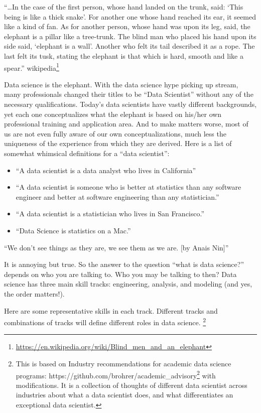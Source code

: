 \documentclass[12pt,]{krantz}
\providecommand{\tightlist}{%
  \setlength{\itemsep}{0pt}\setlength{\parskip}{0pt}}
\renewenvironment{quote}{\begin{VF}}{\end{VF}}
\renewcommand{\href}[2]{#2\footnote{\url{#1}}}
\theoremstyle{definition}
\theoremstyle{definition}
\theoremstyle{definition}
\theoremstyle{remark}
\begin{document}
\begin{quote}
``\ldots{}In the case of the first person, whose hand landed on the
trunk, said: `This being is like a thick snake'. For another one whose
hand reached its ear, it seemed like a kind of fan. As for another
person, whose hand was upon its leg, said, the elephant is a pillar like
a tree-trunk. The blind man who placed his hand upon its side said,
`elephant is a wall'. Another who felt its tail described it as a rope.
The last felt its tusk, stating the elephant is that which is hard,
smooth and like a spear.''
\href{https://en.wikipedia.org/wiki/Blind_men_and_an_elephant}{wikipedia}
\end{quote}

Data science is the elephant. With the data science hype picking up
stream, many professionals changed their titles to be ``Data Scientist''
without any of the necessary qualifications. Today's data scientists
have vastly different backgrounds, yet each one conceptualizes what the
elephant is based on his/her own professional training and application
area. And to make matters worse, most of us are not even fully aware of
our own conceptualizations, much less the uniqueness of the experience
from which they are derived. Here is a list of somewhat whimsical
definitions for a ``data scientist'':

\begin{itemize}
\tightlist
\item
  ``A data scientist is a data analyst who lives in California''
\item
  ``A data scientist is someone who is better at statistics than any
  software engineer and better at software engineering than any
  statistician.''
\item
  ``A data scientist is a statistician who lives in San Francisco.''
\item
  ``Data Science is statistics on a Mac.''
\end{itemize}

\begin{quote}
``We don't see things as they are, we see them as we are. {[}by Anais
Nin{]}''
\end{quote}

It is annoying but true. So the answer to the question ``what is data
science?'' depends on who you are talking to. Who you may be talking to
then? Data science has three main skill tracks: engineering, analysis,
and modeling (and yes, the order matters!).

Here are some representative skills in each track. Different tracks and
combinations of tracks will define different roles in data science.
\footnote{This is based on
  \href{https://github.com/brohrer/academic_advisory}{Industry
  recommendations for academic data science programs:
  https://github.com/brohrer/academic\_advisory} with modifications. It
  is a collection of thoughts of different data scientist across
  industries about what a data scientist does, and what differentiates
  an exceptional data scientist.}
\end{document}

